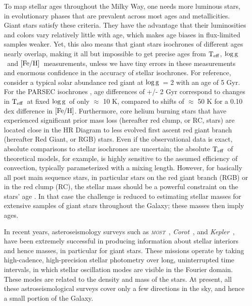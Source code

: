 \documentclass[12pt, preprint]{aastex}
\newcommand{\project}[1]{\textsl{#1}}
\newcommand{\corot}{\project{Corot}}
\newcommand{\kepler}{\project{Kepler}}
\newcommand{\most}{\project{\textsc{most}}}
\newcommand{\teff}{\mbox{$\rm T_{eff}$}}
\newcommand{\feh}{\mbox{$\rm [Fe/H]$}}
\newcommand{\logg}{\mbox{$\rm \log g$}}
\begin{document}
To map stellar ages throughout the Milky Way, one needs more luminous stars, in evolutionary phases that are prevalent  across most ages and metallicities. Giant stars satisfy these criteria. They have the advantage that their luminosities and colors vary relatively little with age, which makes age biases in flux-limited samples weaker. Yet, this also means that giant stars isochrones of different ages nearly overlap, making it all but impossible to get precise ages from \teff , \logg\  and \feh\ measurements, unless we have tiny errors in these measurements and enormous confidence in the accuracy of stellar isochrones. For reference, consider a typical solar abundance red giant at \logg\ = 2 with an age of 5 Gyr.  For the PARSEC isochrones   \citep{Bressan2012}, age differences of +/- 2 Gyr correspond to changes in \teff\ at fixed \logg\ of only $\approx$ 10 K, compared to shifts of $\approx$ 50 K for a 0.10 dex difference in \feh.  Furthermore, core helium burning stars that have experienced significant prior mass loss (hereafter red clump, or RC, stars) are located close in the HR Diagram to less evolved first ascent red giant branch (hereafter Red Giant, or RGB) stars.  Even if the observational data is exact, absolute comparisons to stellar isochrones are uncertain; the absolute \teff\ of theoretical models, for example, is highly sensitive to the assumed efficiency of convection, typically parameterized with a mixing length.  However, for basically all post main sequence stars, in particular stars on the red giant branch (RGB) or in the red clump (RC), the stellar mass should be a powerful constraint on the stars' age \citep[see e.g.][]{Martig2014}. In that case the challenge is reduced to estimating stellar masses for extensive samples of giant stars throughout the Galaxy; these masses then imply ages.

In recent years, asteroseismology surveys such as \most\ \citep{most2005}, \corot\ \citep{corot2009}, and \kepler\ \citep{Bedding2010}, have
been extremely successful in producing information
about stellar interiors and hence masses, in particular for giant stars. 
These missions operate by taking high-cadence, high-precision stellar
photometry over long, uninterrupted time intervals, in which stellar oscillation 
modes are visible in the Fourier domain. These modes are related to the density and mass of the stars.
At present, all these astroseismological surveys cover only a few directions in the sky, and hence a small portion of the Galaxy.
\end{document}
